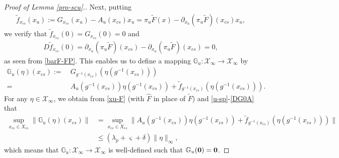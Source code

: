 \documentclass[reqno]{amsart}
\numberwithin{equation}{section}
\begin{document}
\begin{proof}[Proof of Lemma {\rm \ref{pro-scu}}.]
Next, putting
\begin{align*}
\tilde{f}_{x_{cs}}(x_u):=G_{x_{cs}}(x_u)-A_u(x_{cs})x_u
=\pi_u \tilde F(x)-\partial_{x_u}(\pi_u\tilde F)(x_{cs})x_u,
\end{align*}
we verify that $\tilde{f}_{x_{cs}}(0)=G_{x_{cs}}(0)=0$ and
\begin{align}\label{DG0A}
  D\tilde{f}_{x_{cs}}(0)=\partial_{x_u}(\pi_u \tilde F)(x_{cs})-\partial_{x_u}(\pi_u\tilde F)(x_{cs})=0,
\end{align}
as seen from \eqref{barF-FP}.
This enables us to
define a mapping $\mathbb{G}_u: \mathcal{X}_\infty  \to \mathcal{X}_\infty$ by
\begin{align}\label{Fuu}
 \mathbb{G}_u (\eta)(x_{cs})
 := &~G_{g^{-1}(x_{cs})}(\eta(g^{-1}(x_{cs})) )
 \nonumber\\
 = &~A_u(g^{-1}(x_{cs}))  \eta(g^{-1}(x_{cs}))+ \tilde{f}_{g^{-1}(x_{cs})}(\eta(g^{-1}(x_{cs})) ).
\end{align}
For any $\eta\in \mathcal{X}_\infty$, we obtain from \eqref{xu-F} (with $\hat F$ in place of $\tilde F$) and   \eqref{u-sp}-\eqref{DG0A} that
\begin{align*}
\sup_{x_{cs}\in X_{cs}} \|\mathbb{G}_u (\eta)(x_{cs})\|
&=\sup_{x_{cs}\in X_{cs}} \big\| A_u(g^{-1}(x_{cs}))  \eta(g^{-1}(x_{cs}))+ \tilde{f}_{g^{-1}(x_{cs})}(\eta(g^{-1}(x_{cs})) ) \big\|
\\
&\le(\lambda_p+\varsigma + \delta) \|\eta\|_\infty,
\end{align*}
which means that $\mathbb{G}_u:\mathcal{X}_\infty  \to \mathcal{X}_\infty$ is well-defined such that $\mathbb{G}_u({\bf 0})={\bf 0}$.


\end{proof}
\end{document}
